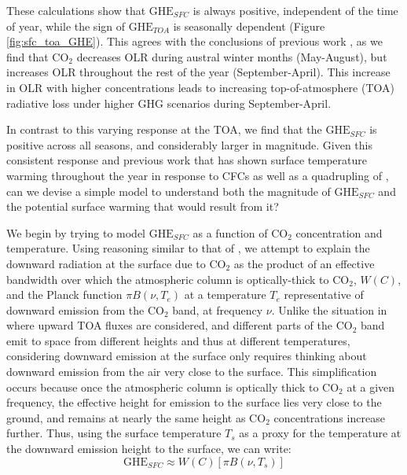 \documentclass[draft]{agujournal2019}
\begin{document}
These calculations show that ${\text{GHE}_{SFC}}$ is always positive, independent of the time of year, while the sign of ${\text{GHE}_{TOA}}$ is seasonally dependent (Figure \ref{fig:sfc_toa_GHE}). This agrees with the conclusions of previous work  \cite{schmithusen_how_2015}, as we find that CO$_2$ decreases OLR during austral winter months (May-August), but increases OLR throughout the rest of the year (September-April). This increase in OLR with higher  concentrations leads to increasing top-of-atmosphere (TOA) radiative loss under higher GHG scenarios during September-April. 

In contrast to this varying response at the TOA, we find that the ${\text{GHE}_{SFC}}$ is positive across all seasons, and considerably larger in magnitude. Given this consistent response and previous work that has shown surface temperature warming throughout the year in response to CFCs \cite{flanner_climate_2018} as well as a quadrupling of  \cite{smith_no_2018}, can we devise a simple model to understand both the magnitude of ${\text{GHE}_{SFC}}$ and the potential surface warming that would result from it? 

We begin by trying to model ${\text{GHE}_{SFC}}$ as a function of CO$_2$ concentration and temperature. Using reasoning similar to that of , we attempt to explain the downward radiation at the surface due to CO$_2$ as the product of an effective bandwidth over which the atmospheric column is optically-thick to CO$_2$, $W(C)$, and the Planck function $\pi B(\nu,T_e)$ at a temperature $T_e$ representative of downward emission from the CO$_2$ band, at frequency $\nu$. Unlike the situation in  where upward TOA fluxes are considered, and different parts of the CO$_2$ band emit to space from different heights and thus at different temperatures, considering downward emission at the surface only requires thinking about downward emission from the air very close to the surface. This simplification occurs because once the atmospheric column is optically thick to CO$_2$ at a given frequency, the effective height for emission to the surface lies very close to the ground, and remains at nearly the same height as CO$_2$ concentrations increase further. Thus, using the surface temperature $T_s$ as a proxy for the temperature at the downward emission height to the surface, we can write:
\begin{equation}
    {\text{GHE}_{SFC}} \approx W(C)[\pi B(\nu,T_s)] \label{eq:ghe_sfc}
\end{equation}
\end{document}
